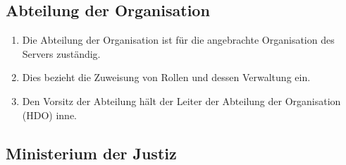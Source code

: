 \documentclass{article}
\begin{document}
\subsection{Abteilung der Organisation}
\begin{enumerate}[(1)]
    \item Die Abteilung der Organisation ist für die angebrachte Organisation des Servers zuständig.
    \item Dies bezieht die Zuweisung von Rollen und dessen Verwaltung ein.
    \item Den Vorsitz der Abteilung hält der Leiter der Abteilung der Organisation (HDO) inne.
\end{enumerate}

\subsection{Ministerium der Justiz}
\end{document}
